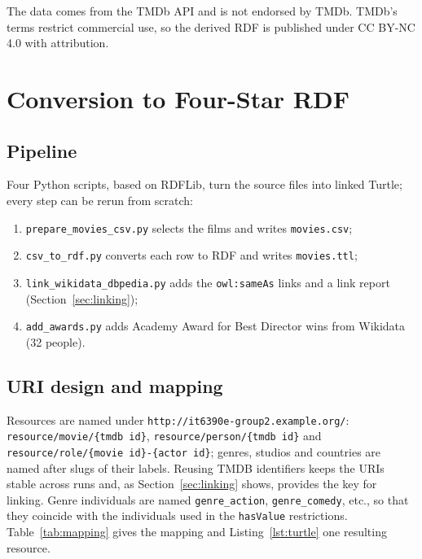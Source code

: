\documentclass[11pt,a4paper]{article}
\newcommand{\code}[1]{\texttt{#1}}
\begin{document}
\noindent The data comes from the TMDb API and is not endorsed by TMDb. TMDb's terms restrict commercial use, so the derived RDF is published under CC BY-NC 4.0 with attribution.

\section{Conversion to Four-Star RDF}\label{sec:rdf}

\subsection{Pipeline}

Four Python scripts, based on RDFLib, turn the source files into linked Turtle; every step can be rerun from scratch:
\begin{enumerate}
  \item \code{prepare\_movies\_csv.py} selects the films and writes \code{movies.csv};
  \item \code{csv\_to\_rdf.py} converts each row to RDF and writes \code{movies.ttl};
  \item \code{link\_wikidata\_dbpedia.py} adds the \code{owl:sameAs} links and a link report (Section~\ref{sec:linking});
  \item \code{add\_awards.py} adds Academy Award for Best Director wins from Wikidata (32 people).
\end{enumerate}

\subsection{URI design and mapping}

Resources are named under \code{http://it6390e-group2.example.org/}: \code{resource/movie/\{tmdb id\}}, \code{resource/person/\{tmdb id\}} and \code{resource/role/\{movie id\}-\{actor id\}}; genres, studios and countries are named after slugs of their labels. Reusing TMDB identifiers keeps the URIs stable across runs and, as Section~\ref{sec:linking} shows, provides the key for linking. Genre individuals are named \code{genre\_action}, \code{genre\_comedy}, etc., so that they coincide with the individuals used in the \code{hasValue} restrictions. Table~\ref{tab:mapping} gives the mapping and Listing~\ref{lst:turtle} one resulting resource.
\end{document}
